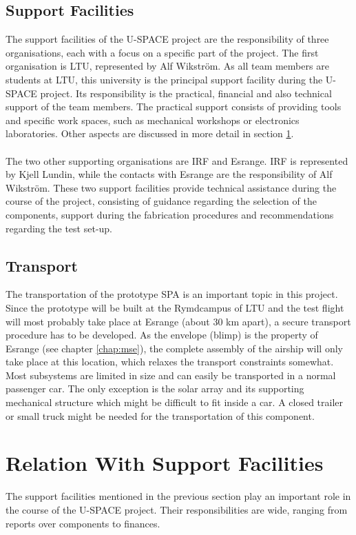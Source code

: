 \subsection{Support Facilities}
%
The support facilities of the \ac{U-SPACE} project are the responsibility of three organisations, each with a focus on a specific part of the project. The first organisation is \ac{LTU}, represented by Alf Wikström. As all team members are students at \ac{LTU}, this university is the principal support facility during the \ac{U-SPACE} project. Its responsibility is the practical, financial and also technical support of the team members. The practical support consists of providing tools and specific work spaces, such as mechanical workshops or electronics laboratories. Other aspects are discussed in more detail in section \ref{sec:relation_support}.
\\
\\
The two other supporting organisations are \ac{IRF} and Esrange. \ac{IRF} is represented by Kjell Lundin, while the contacts with Esrange are the responsibility of Alf Wikström. These two support facilities provide technical assistance during the course of the project, consisting of guidance regarding the selection of the components, support during the fabrication procedures and recommendations regarding the test set-up.
%
\subsection{Transport}
%
The transportation of the prototype \ac{SPA} is an important topic in this project. Since the prototype will be built at the Rymdcampus of \ac{LTU} and the test flight will most probably take place at Esrange (about 30 km apart), a secure transport procedure has to be developed. As the envelope (blimp) is the property of Esrange (see chapter \ref{chap:mse}), the complete assembly of the airship will only take place at this location, which relaxes the transport constraints somewhat. Most subsystems are limited in size and can easily be  transported in a normal passenger car. The only exception is the solar array and its supporting mechanical structure which might be difficult to fit inside a car. A closed trailer or small truck might be needed for the transportation of this component.
%
\section{Relation With Support Facilities}
\label{sec:relation_support}
%
The support facilities mentioned in the previous section play an important role in the course of the \ac{U-SPACE} project. Their responsibilities are wide, ranging from reports over components to finances.
%
